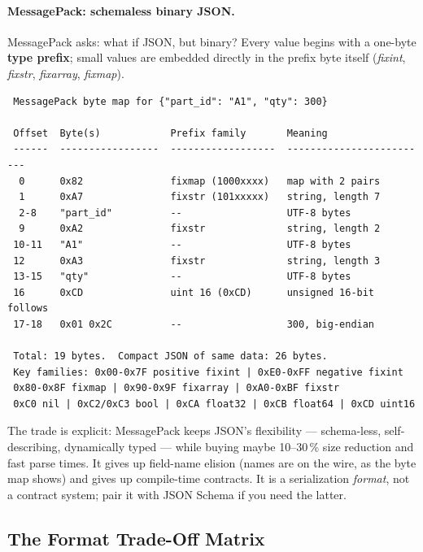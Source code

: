 \paragraph{MessagePack: schemaless binary JSON.}
MessagePack asks: what if JSON, but binary? Every value begins with a one-byte
\textbf{type prefix}; small values are embedded directly in the prefix byte itself
(\emph{fixint}, \emph{fixstr}, \emph{fixarray}, \emph{fixmap}).

\begin{verbatim}
 MessagePack byte map for {"part_id": "A1", "qty": 300}

 Offset  Byte(s)            Prefix family       Meaning
 ------  -----------------  ------------------  -------------------------
  0      0x82               fixmap (1000xxxx)   map with 2 pairs
  1      0xA7               fixstr (101xxxxx)   string, length 7
  2-8    "part_id"          --                  UTF-8 bytes
  9      0xA2               fixstr              string, length 2
 10-11   "A1"               --                  UTF-8 bytes
 12      0xA3               fixstr              string, length 3
 13-15   "qty"              --                  UTF-8 bytes
 16      0xCD               uint 16 (0xCD)      unsigned 16-bit follows
 17-18   0x01 0x2C          --                  300, big-endian

 Total: 19 bytes.  Compact JSON of same data: 26 bytes.
 Key families: 0x00-0x7F positive fixint | 0xE0-0xFF negative fixint
 0x80-0x8F fixmap | 0x90-0x9F fixarray | 0xA0-0xBF fixstr
 0xC0 nil | 0xC2/0xC3 bool | 0xCA float32 | 0xCB float64 | 0xCD uint16
\end{verbatim}

The trade is explicit: MessagePack keeps JSON's flexibility --- schema-less,
self-describing, dynamically typed --- while buying maybe 10--30\,\% size reduction
and fast parse times. It gives up field-name elision (names are on the wire, as the
byte map shows) and gives up compile-time contracts. It is a serialization
\emph{format}, not a contract system; pair it with JSON Schema if you need the
latter.

\subsection{The Format Trade-Off Matrix}
\label{sec:ch4-tradematrix}

